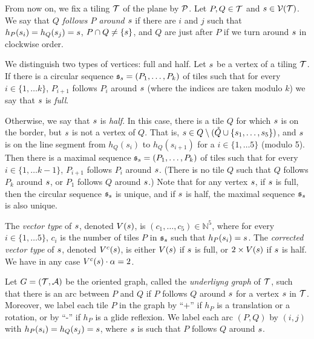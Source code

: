 \documentclass[11pt]{article}
\theoremstyle{definition}
\begin{document}
From now on, we fix a tiling $\mathcal{T}$ of the plane by $\mathcal{P}$.
%
%
Let $P,Q\in \mathcal{T}$ and $s \in \mathcal{V}(\mathcal{T})$. We say that \emph{$Q$ follows $P$ around $s$} if there are $i$ and $j$ such that $h_P(s_i)=h_Q(s_j)=s$, $P\cap Q \ne \{s\}$,
and $Q$ are just after $P$ if we turn around $s$ in clockwise order.

%

We distinguish two types of vertices: full and half.
Let $s$ be a vertex of a tiling $\mathcal{T}$. %
%
If there is a circular sequence $\mathfrak{s}_s=(P_1,\ldots, P_k)$ of tiles such that for every $i\in\{1,\ldots k\}$, $P_{i+1}$ follows $P_i$ around $s$ (where the indices are taken modulo $k$) we say that $s$ is \emph{full}. 

Otherwise, we say that $s$ is \emph{half}. In this case, there is a tile $Q$ for which $s$ is on the border, but $s$ is not a vertex of $Q$. That is, $s \in Q \setminus (\mathring{Q} \cup \{s_1,\ldots, s_5\})$, and $s$ is on the line segment from $h_Q(s_i)$ to $h_Q(s_{i+1})$ for a $i\in\{1,\ldots 5\}$ (modulo 5). Then there is a maximal sequence $\mathfrak{s}_s=(P_1,\ldots, P_k)$ of tiles such that for every $i\in \{1,\ldots k-1\}$, $P_{i+1}$ follows $P_i$ around $s$. (There is no tile $Q$ such that $Q$ follows $P_k$ around $s$, or $P_1$ follows $Q$ around $s$.) Note that for any vertex $s$, if $s$ is full, then the circular sequence $\mathfrak{s}_s$ is unique, and if $s$ is half, the maximal sequence $\mathfrak{s}_s$ is also unique.

%

The \emph{vector type} of $s$, denoted $V(s)$, is $(c_1,\ldots,c_5) \in \mathbb{N}^5$, where for every $i\in\{1,\ldots 5\}$, $c_i$ is the number of tiles $P$ in $\mathfrak{s}_s$ such that $h_P(s_i)=s$.
The \emph{corrected vector type} of $s$, denoted ${V^c}(s)$, is either $V(s)$ if $s$ is full, or $2\times V(s)$ if $s$ is half.
We have in any case ${V^c}(s) \cdot \alpha =2$.

%

\def\arcs{\mathcal{A}}
Let $G=(\tiling,\arcs)$ be the oriented graph, called the \emph{underliyng graph} of $\mathcal{T}$, such that there is an arc between $P$ and $Q$ if $P$ follows $Q$ around $s$ for a vertex $s$ in $\mathcal{T}$. 
Moreover, we label each tile $P$ in the graph by ``$+$'' if $h_P$ is a translation or a rotation, or by ``-'' if $h_P$ is a glide reflexion.
We label each arc $(P,Q)$ by $(i,j)$ with $h_P(s_i) = h_Q(s_j) =s$, where $s$ is such that $P$ follows $Q$ around $s$.
\end{document}
